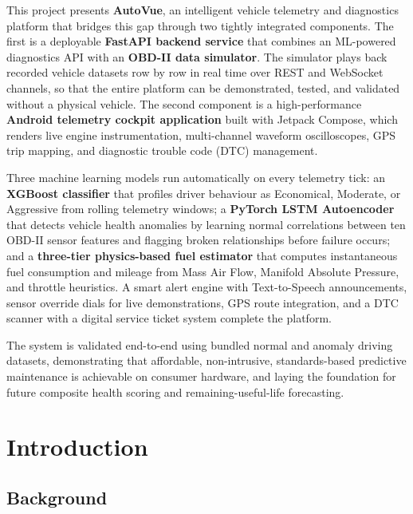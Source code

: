\documentclass[10pt,a4paper]{report}
\begin{document}
This project presents \textbf{AutoVue}, an intelligent vehicle telemetry and diagnostics platform that bridges this gap through two tightly integrated components. The first is a deployable \textbf{FastAPI backend service} that combines an ML-powered diagnostics API with an \textbf{OBD-II data simulator}. The simulator plays back recorded vehicle datasets row by row in real time over REST and WebSocket channels, so that the entire platform can be demonstrated, tested, and validated without a physical vehicle. The second component is a high-performance \textbf{Android telemetry cockpit application} built with Jetpack Compose, which renders live engine instrumentation, multi-channel waveform oscilloscopes, GPS trip mapping, and diagnostic trouble code (DTC) management.

Three machine learning models run automatically on every telemetry tick: an \textbf{XGBoost classifier} that profiles driver behaviour as Economical, Moderate, or Aggressive from rolling telemetry windows; a \textbf{PyTorch LSTM Autoencoder} that detects vehicle health anomalies by learning normal correlations between ten OBD-II sensor features and flagging broken relationships before failure occurs; and a \textbf{three-tier physics-based fuel estimator} that computes instantaneous fuel consumption and mileage from Mass Air Flow, Manifold Absolute Pressure, and throttle heuristics. A smart alert engine with Text-to-Speech announcements, sensor override dials for live demonstrations, GPS route integration, and a DTC scanner with a digital service ticket system complete the platform.

The system is validated end-to-end using bundled normal and anomaly driving datasets, demonstrating that affordable, non-intrusive, standards-based predictive maintenance is achievable on consumer hardware, and laying the foundation for future composite health scoring and remaining-useful-life forecasting.

\newpage

\pagestyle{plain}
\tableofcontents
\listoffigures
\listoftables
\newpage

\chapter{Introduction}
\par
\section{Background}
\end{document}
